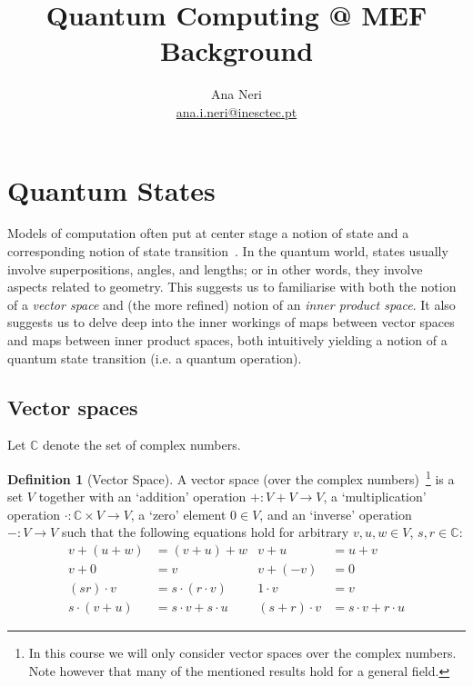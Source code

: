 \documentclass[a4paper, 11pt]{article}
\date{}
\newcommand{\complex}{\mathbb{C}}
\theoremstyle{definition}
\newtheorem{definition}{Definition}
\begin{document}
\title{Quantum Computing @ MEF \\ \large Background}
\author{Ana Neri \\ \scriptsize
\href{mailto:ana.i.neri@inesctec.pt}{ana.i.neri@inesctec.pt}}
\maketitle

\section{Quantum States}

Models of computation often put at center stage a notion of state and
a corresponding notion of state transition~\cite{bruni17}. In the
quantum world, states usually involve superpositions, angles, and
lengths; or in other words, they involve aspects related to
geometry. This suggests us to familiarise with both the notion of a
\emph{vector space} and (the more refined) notion of an \emph{inner
  product space}. It also suggests us to delve deep into the inner
workings of maps between vector spaces and maps between inner product
spaces, both intuitively yielding a notion of a quantum state
transition (i.e. a quantum operation).

\subsection{Vector spaces}

Let $\complex$ denote the set of complex numbers.

\begin{definition}[Vector Space]
  A vector space (over the complex numbers)~\footnote{In this course
    we will only consider vector spaces over the complex numbers. Note
    however that many of the mentioned results hold for a general
    field.} is a set $V$ together with an `addition' operation
  $+ : V + V \to V$, a `multiplication' operation
  $\cdot : \complex \times V \to V$, a `zero' element $0 \in V$, and
  an `inverse' operation $- : V \to V$ such that the following
  equations hold for arbitrary $v,u,w \in V$, $s,r \in \complex$:
  \begin{align*}
    v + (u + w) & = (v + u) + w & v + u & = u + v  \\
    v + 0 & = v & v + (-v) & = 0 \\
    (s r) \cdot v & = s \cdot (r \cdot v) & 1 \cdot v & = v  \\
    s \cdot (v + u) & = s \cdot v + s \cdot u & (s + r) \cdot v & = s \cdot v + r \cdot u
  \end{align*}
\end{definition}
\end{document}
